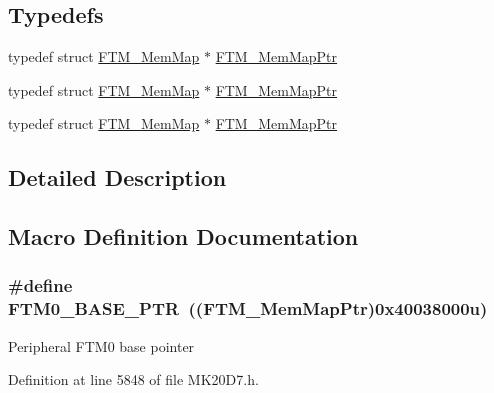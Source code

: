\subsection*{Typedefs}
\begin{DoxyCompactItemize}
\item 
typedef struct \hyperlink{struct_f_t_m___mem_map}{F\+T\+M\+\_\+\+Mem\+Map} $\ast$ \hyperlink{group___f_t_m___peripheral_gaafa7875c9deb2b3afe4aa22ce6a99d39}{F\+T\+M\+\_\+\+Mem\+Map\+Ptr}
\item 
typedef struct \hyperlink{struct_f_t_m___mem_map}{F\+T\+M\+\_\+\+Mem\+Map} $\ast$ \hyperlink{group___f_t_m___peripheral_gaafa7875c9deb2b3afe4aa22ce6a99d39}{F\+T\+M\+\_\+\+Mem\+Map\+Ptr}
\item 
typedef struct \hyperlink{struct_f_t_m___mem_map}{F\+T\+M\+\_\+\+Mem\+Map} $\ast$ \hyperlink{group___f_t_m___peripheral_gaafa7875c9deb2b3afe4aa22ce6a99d39}{F\+T\+M\+\_\+\+Mem\+Map\+Ptr}
\end{DoxyCompactItemize}


\subsection{Detailed Description}


\subsection{Macro Definition Documentation}
\subsubsection[{\texorpdfstring{F\+T\+M0\+\_\+\+B\+A\+S\+E\+\_\+\+P\+TR}{FTM0_BASE_PTR}}]{\setlength{\rightskip}{0pt plus 5cm}\#define F\+T\+M0\+\_\+\+B\+A\+S\+E\+\_\+\+P\+TR~(({\bf F\+T\+M\+\_\+\+Mem\+Map\+Ptr})0x40038000u)}\hypertarget{group___f_t_m___peripheral_gae712c29b7abcf338d8f8f6418683fa66}{}\label{group___f_t_m___peripheral_gae712c29b7abcf338d8f8f6418683fa66}
Peripheral F\+T\+M0 base pointer 

Definition at line 5848 of file M\+K20\+D7.\+h.

